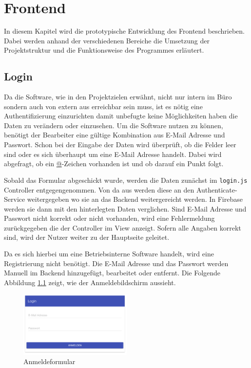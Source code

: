 \chapter{Frontend}
\label{chap_frontend}
In diesem Kapitel wird die prototypische Entwicklung des Frontend beschrieben. Dabei werden anhand der verschiedenen Bereiche die Umsetzung der
Projektstruktur und die Funktionsweise des Programmes erläutert.

\section{Login}
Da die Software, wie in den Projektzielen erwähnt, nicht nur intern im Büro sondern auch von extern aus erreichbar sein muss, ist es nötig eine Authentifizierung
einzurichten damit unbefugte keine Möglichkeiten haben die Daten zu verändern oder einzusehen. Um die Software nutzen zu können, benötigt der Bearbeiter eine gültige
Kombination aus E-Mail Adresse und Passwort. Schon bei der Eingabe der Daten wird überprüft, ob die Felder leer sind oder es sich überhaupt um eine E-Mail Adresse handelt. Dabei wird
abgefragt, ob ein \url{@}-Zeichen vorhanden ist und ob darauf ein Punkt folgt.

Sobald das Formular abgeschickt wurde, werden die Daten zunächst im \texttt{login.js} Controller entgegengenommen. Von da aus werden diese an den Authenticate-Service
weitergegeben wo sie an das Backend weitergereicht werden. In Firebase werden sie dann mit den hinterlegten Daten verglichen. Sind E-Mail Adresse und Passwort nicht
korrekt oder nicht vorhanden, wird eine Fehlermeldung zurückgegeben die der Controller im View anzeigt. Sofern alle Angaben korrekt sind, wird der Nutzer weiter zu
der Hauptseite geleitet.

Da es sich hierbei um eine Betriebsinterne Software handelt, wird eine Registrierung nicht benötigt. Die E-Mail Adresse und das Passwort werden Manuell im Backend hinzugefügt, bearbeitet oder entfernt. Die Folgende Abbildung \ref{frontend_login} zeigt, wie der Anmeldebildschirm aussieht. 

\begin{figure}[H]
\centering\includegraphics[width=0.5\textwidth]{images/frontend_login.png}
\caption{Anmeldeformular}
\label{frontend_login}
\end{figure}

